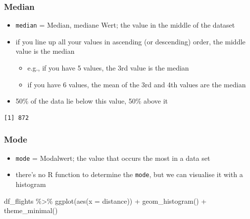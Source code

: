 \documentclass[
  letterpaper,
  DIV=11]{scrartcl}
\newenvironment{Shaded}{\begin{snugshade}}{\end{snugshade}}
\newcommand{\AttributeTok}[1]{\textcolor[rgb]{0.40,0.45,0.13}{#1}}
\newcommand{\FunctionTok}[1]{\textcolor[rgb]{0.28,0.35,0.67}{#1}}
\newcommand{\NormalTok}[1]{\textcolor[rgb]{0.00,0.23,0.31}{#1}}
\newcommand{\SpecialCharTok}[1]{\textcolor[rgb]{0.37,0.37,0.37}{#1}}
\providecommand{\tightlist}{%
  \setlength{\itemsep}{0pt}\setlength{\parskip}{0pt}}\usepackage{longtable,booktabs,array}
\begin{document}
\hypertarget{median}{%
\subsubsection{Median}\label{median}}

\begin{itemize}
\tightlist
\item
  \texttt{median} = Median, mediane Wert; the value in the middle of the
  dataset
\item
  if you line up all your values in ascending (or descending) order, the
  middle value is the median

  \begin{itemize}
  \tightlist
  \item
    e.g., if you have 5 values, the 3rd value is the median
  \item
    if you have 6 values, the mean of the 3rd and 4th values are the
    median
  \end{itemize}
\item
  50\% of the data lie below this value, 50\% above it
\end{itemize}

\begin{Shaded}
\end{Shaded}

\begin{verbatim}
[1] 872
\end{verbatim}

\hypertarget{mode}{%
\subsubsection{Mode}\label{mode}}

\begin{itemize}
\tightlist
\item
  \texttt{mode} = Modalwert; the value that occurs the most in a data
  set
\item
  there's no R function to determine the \texttt{mode}, but we can
  visualise it with a histogram
\end{itemize}

\begin{Shaded}
\begin{Highlighting}[]
\NormalTok{df\_flights }\SpecialCharTok{\%\textgreater{}\%} 
  \FunctionTok{ggplot}\NormalTok{(}\FunctionTok{aes}\NormalTok{(}\AttributeTok{x =}\NormalTok{ distance)) }\SpecialCharTok{+}
  \FunctionTok{geom\_histogram}\NormalTok{() }\SpecialCharTok{+}
  \FunctionTok{theme\_minimal}\NormalTok{() }
\end{Highlighting}
\end{Shaded}
\end{document}
